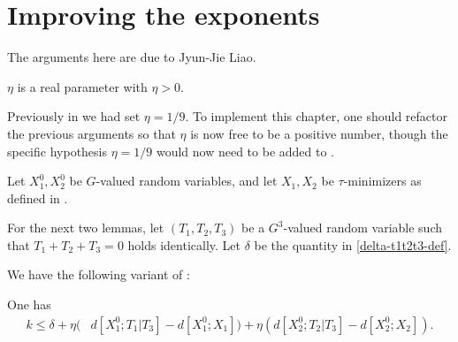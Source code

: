 \chapter{Improving the exponents}

The arguments here are due to Jyun-Jie Liao.

\begin{definition}\label{eta-def-new}\leanok  $\eta$ is a real parameter with $\eta > 0$.
\end{definition}

Previously in  we had set $\eta=1/9$.  To implement
this chapter, one should refactor the previous arguments so that $\eta$ is
now free to be a positive number, though the specific hypothesis $\eta=1/9$
would now need to be added to .

Let $X^0_1, X^0_2$ be $G$-valued random variables, and let $X_1, X_2$ be $\tau$-minimizers as defined in .

For the next two lemmas, let $(T_1,T_2,T_3)$ be a $G^3$-valued random variable such that $T_1+T_2+T_3=0$ holds identically. Let $\delta$ be the quantity in \eqref{delta-t1t2t3-def}.

We have the following variant of :

\begin{lemma}\label{construct-good-prelim-improv}\leanok
  One has
  \begin{align*}  k \leq
    \delta + \eta (& d[X^0_1;T_1|T_3]-d[X^0_1;X_1])
      + \eta (d[X^0_2;T_2|T_3]-d[X^0_2;X_2]).
  \end{align*}
\end{lemma}

